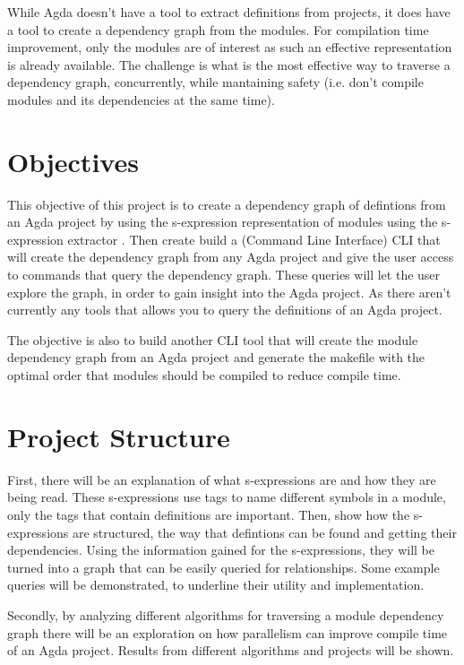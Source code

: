 While Agda doesn't have a tool to extract definitions from projects, it does
have a tool to create a dependency graph from the modules. For compilation time
improvement, only the modules are of interest as such an effective
representation is already available. The challenge is what is the most
effective way to traverse a dependency graph, concurrently, while mantaining
safety (i.e. don't compile modules and its dependencies at the same time). 


\section{Objectives}

This objective of this project is to create a dependency graph of defintions
from an Agda project by using the s-expression representation of modules using
the s-expression extractor \cite{andrej}. Then create build a (Command Line
Interface) CLI that will create the dependency graph from any Agda project and
give the user access to commands that query the dependency graph. These queries
will let the user explore the graph, in order to gain insight into the Agda
project. As there aren't currently any tools that allows you to query the
definitions of an Agda project. 

The objective is also to build another CLI tool that will create the module
dependency graph from an Agda project and generate the makefile with the
optimal order that modules should be compiled to reduce compile time.

\section{Project Structure}

First, there will be an explanation of what s-expressions are and how they are
being read. These s-expressions use tags to name different symbols in a module,
only the tags that contain definitions are important. Then, show how the
s-expressions are structured, the way that defintions can be found and getting
their dependencies. Using the information gained for the s-expressions, they
will be turned into a graph that can be easily queried for relationships. Some
example queries will be demonstrated, to underline their utility and
implementation.

Secondly, by analyzing different algorithms for traversing a module dependency
graph there will be an exploration on how parallelism can improve compile time
of an Agda project. Results from different algorithms and projects will be
shown.

